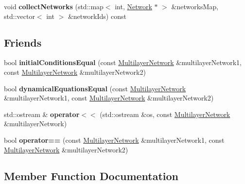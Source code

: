 \begin{DoxyCompactItemize}
\item 
void {\bfseries collect\+Networks} (std\+::map$<$ int, \hyperlink{classNetwork}{Network} $\ast$ $>$ \&networks\+Map, std\+::vector$<$ int $>$ \&network\+Ids) const \hypertarget{classMultilayerNetwork_a9e846141725eb38c565af6db4040cf34}{}\label{classMultilayerNetwork_a9e846141725eb38c565af6db4040cf34}

\end{DoxyCompactItemize}
\subsection*{Friends}
\begin{DoxyCompactItemize}
\item 
bool {\bfseries initial\+Conditions\+Equal} (const \hyperlink{classMultilayerNetwork}{Multilayer\+Network} \&multilayer\+Network1, const \hyperlink{classMultilayerNetwork}{Multilayer\+Network} \&multilayer\+Network2)\hypertarget{classMultilayerNetwork_a64691b2acaece23358b93a9e66625219}{}\label{classMultilayerNetwork_a64691b2acaece23358b93a9e66625219}

\item 
bool {\bfseries dynamical\+Equations\+Equal} (const \hyperlink{classMultilayerNetwork}{Multilayer\+Network} \&multilayer\+Network1, const \hyperlink{classMultilayerNetwork}{Multilayer\+Network} \&multilayer\+Network2)\hypertarget{classMultilayerNetwork_ab9211d4a43da6142bc9acaa862a27bc0}{}\label{classMultilayerNetwork_ab9211d4a43da6142bc9acaa862a27bc0}

\item 
std\+::ostream \& {\bfseries operator$<$$<$} (std\+::ostream \&os, const \hyperlink{classMultilayerNetwork}{Multilayer\+Network} \&multilayer\+Network)\hypertarget{classMultilayerNetwork_a42b39b2faefcb63564d2e4ba5cfeac26}{}\label{classMultilayerNetwork_a42b39b2faefcb63564d2e4ba5cfeac26}

\item 
bool {\bfseries operator==} (const \hyperlink{classMultilayerNetwork}{Multilayer\+Network} \&multilayer\+Network1, const \hyperlink{classMultilayerNetwork}{Multilayer\+Network} \&multilayer\+Network2)\hypertarget{classMultilayerNetwork_a63e44ec945c844ee62bb16debee88369}{}\label{classMultilayerNetwork_a63e44ec945c844ee62bb16debee88369}

\end{DoxyCompactItemize}


\subsection{Member Function Documentation}
